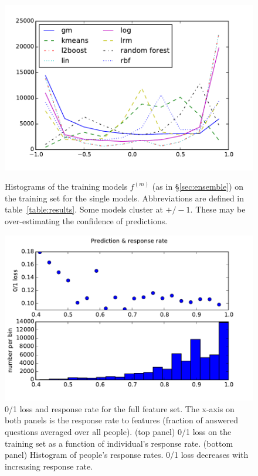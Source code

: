 \documentclass{article} %
\begin{document}
\begin{figure}
\centering
\begin{minipage}[t]{0.48\textwidth}
\includegraphics[width=\linewidth]{figures/confidence_dist.pdf}
\caption{Histograms of the training models $f^{(m)}$ (as in \S\ref{sec:ensemble}) on the training set for the single models.  Abbreviations are defined in table~\ref{table:results}.  Some models cluster at \mbox{$+/-1$}.  These may be over-estimating the confidence of predictions. }
\label{fig:confidence_dist}
\end{minipage}%
\hfill
\begin{minipage}[t]{0.48\textwidth} 
\centering
\includegraphics[width=\linewidth]{figures/prediction_response_rate.pdf}
\caption{0/1 loss and response rate for the full feature set.  The x-axis on both panels is the response rate to features (fraction of answered questions averaged over all people). (top panel) 0/1 loss on the training set as a function of individual's response rate.  (bottom panel) Histogram of people's response rates.  0/1 loss decreases with increasing response rate. }
\label{fig:prediction_response_rate}
\end{minipage}
\end{figure}
\end{document}
